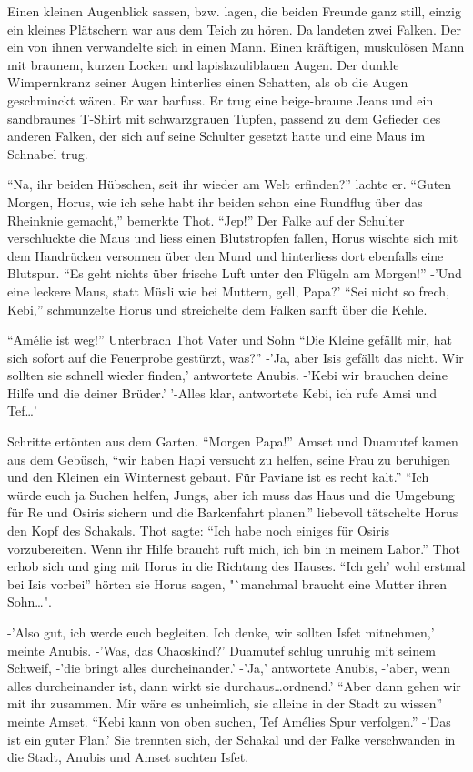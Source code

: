 \documentclass[11pt,titlepage,a5paper]{book}
\begin{document}
Einen kleinen Augenblick sassen, bzw. lagen, die beiden Freunde ganz still, einzig ein kleines Plätschern war aus dem Teich zu hören. Da landeten zwei Falken. Der ein von ihnen verwandelte sich in einen Mann. Einen kräftigen, muskulösen Mann mit braunem, kurzen Locken und lapislazuliblauen Augen. Der dunkle Wimpernkranz seiner Augen hinterlies einen Schatten, als ob die Augen geschminckt wären. Er war barfuss. Er trug eine beige-braune Jeans und ein sandbraunes T-Shirt mit schwarzgrauen Tupfen, passend zu dem Gefieder des anderen Falken, der sich auf seine Schulter gesetzt hatte und eine Maus im Schnabel trug. 

"`Na, ihr beiden Hübschen, seit ihr wieder am Welt erfinden?"' lachte er. "`Guten Morgen, Horus, wie ich sehe habt ihr beiden schon eine Rundflug über das Rheinknie gemacht,"' bemerkte Thot. "`Jep!"' Der Falke auf der Schulter verschluckte die Maus und liess einen Blutstropfen fallen, Horus wischte sich mit dem Handrücken versonnen über den Mund und hinterliess dort ebenfalls eine Blutspur. "`Es geht nichts über frische Luft unter den Flügeln am Morgen!"' -'Und eine leckere Maus, statt Müsli wie bei Muttern, gell, Papa?' "`Sei nicht so frech, Kebi,"' schmunzelte Horus und streichelte dem Falken sanft über die Kehle. 

"`Amélie ist weg!"' Unterbrach Thot Vater und Sohn "`Die Kleine gefällt mir, hat sich sofort auf die Feuerprobe gestürzt, was?"' -'Ja, aber Isis gefällt das nicht. Wir sollten sie schnell wieder finden,' antwortete Anubis. -'Kebi wir brauchen deine Hilfe und die deiner Brüder.' '-Alles klar, antwortete Kebi, ich rufe Amsi und Tef\dots ' 

Schritte ertönten aus dem Garten. "`Morgen Papa!"' Amset und Duamutef kamen aus dem Gebüsch, "`wir haben Hapi versucht zu helfen, seine Frau zu beruhigen und den Kleinen ein Winternest gebaut. Für Paviane ist es recht kalt."' "`Ich würde euch ja Suchen helfen, Jungs, aber ich muss das Haus und die Umgebung für Re und Osiris sichern und die Barkenfahrt planen."' liebevoll tätschelte Horus den Kopf des Schakals. Thot sagte: "`Ich habe noch einiges für Osiris vorzubereiten. Wenn ihr Hilfe braucht ruft mich, ich bin in meinem Labor."' Thot erhob sich und ging mit Horus in die Richtung des Hauses. "`Ich geh' wohl erstmal bei Isis vorbei"' hörten sie Horus sagen, "`manchmal braucht eine Mutter ihren Sohn\dots".

-'Also gut, ich werde euch begleiten. Ich denke, wir sollten Isfet mitnehmen,' meinte Anubis. -'Was, das Chaoskind?' Duamutef schlug unruhig mit seinem Schweif, -'die bringt alles durcheinander.' -'Ja,' antwortete Anubis, -'aber, wenn alles durcheinander ist, dann wirkt sie durchaus\dots ordnend.' "`Aber dann gehen wir mit ihr zusammen. Mir wäre es unheimlich, sie alleine in der Stadt zu wissen"' meinte Amset. "`Kebi kann von oben suchen, Tef Amélies Spur verfolgen."' -'Das ist ein guter Plan.' Sie trennten sich, der Schakal und der Falke verschwanden in die Stadt, Anubis und Amset suchten Isfet.
\end{document}
